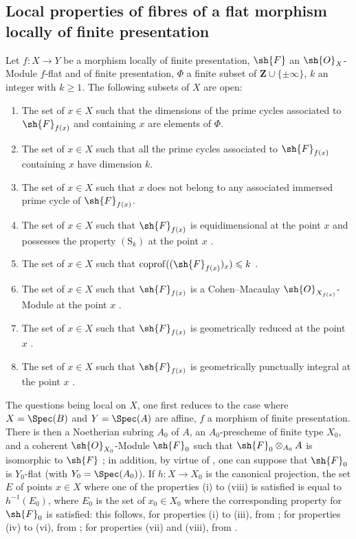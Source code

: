 \subsection{Local properties of fibres of a flat morphism locally of finite presentation}
\label{subsection:IV.12.1}

\begin{theorem}[12.1.1]
\label{IV.12.1.1}
Let $f:X\to Y$ be a morphism locally of finite presentation, $\sh{F}$ an $\sh{O}_X$-Module $f$-flat and of finite presentation, $\Phi$ a finite subset of $\mathbf{Z}\cup\{\pm\infty\}$, $k$ an integer with $k\geqslant 1$.
The following subsets of $X$ are open:
\begin{enumerate}[label=(\roman*)]
  \item The set of $x\in X$ such that the dimensions of the prime cycles associated to $\sh{F}_{f(x)}$ and containing $x$ are elements of $\Phi$.
  \item The set of $x\in X$ such that all the prime cycles associated to $\sh{F}_{f(x)}$ containing $x$ have dimension $k$.
  \item The set of $x\in X$ such that $x$ does not belong to any associated immersed prime cycle of $\sh{F}_{f(x)}$.
  \item The set of $x\in X$ such that $\sh{F}_{f(x)}$ is equidimensional at the point $x$ and possesses the property $(\mathrm{S}_k)$ at the point $x$ .
  \item The set of $x\in X$ such that $\operatorname{coprof}((\sh{F}_{f(x)})_x)\leqslant k$ .
  \item The set of $x\in X$ such that $\sh{F}_{f(x)}$ is a Cohen--Macaulay $\sh{O}_{X_{f(x)}}$-Module at the point $x$ .
  \item The set of $x\in X$ such that $\sh{F}_{f(x)}$ is geometrically reduced at the point $x$ .
  \item The set of $x\in X$ such that $\sh{F}_{f(x)}$ is geometrically punctually integral at the point $x$ .
\end{enumerate}

The questions being local on $X$, one first reduces to the case where $X=\Spec(B)$ and $Y=\Spec(A)$ are affine, $f$ a morphism of finite presentation.
There is then a Noetherian subring $A_0$ of $A$, an $A_0$-prescheme of finite type $X_0$, and a coherent $\sh{O}_{X_0}$-Module $\sh{F}_0$ such that $\sh{F}_0\otimes_{A_0}A$ is isomorphic to $\sh{F}$ ; in addition, by virtue of , one can suppose that $\sh{F}_0$ is $Y_0$-flat (with $Y_0=\Spec(A_0)$).
If $h:X\to X_0$ is the canonical projection, the set $E$ of points $x\in X$ where one of the properties (i) to (viii) is satisfied is equal to $h^{-1}(E_0)$, where $E_0$ is the set of $x_0\in X_0$ where the corresponding property for $\sh{F}_0$ is satisfied: this follows, for properties (i) to (iii), from ; for properties (iv) to (vi), from ; for properties (vii) and (viii), from .
\end{theorem}

